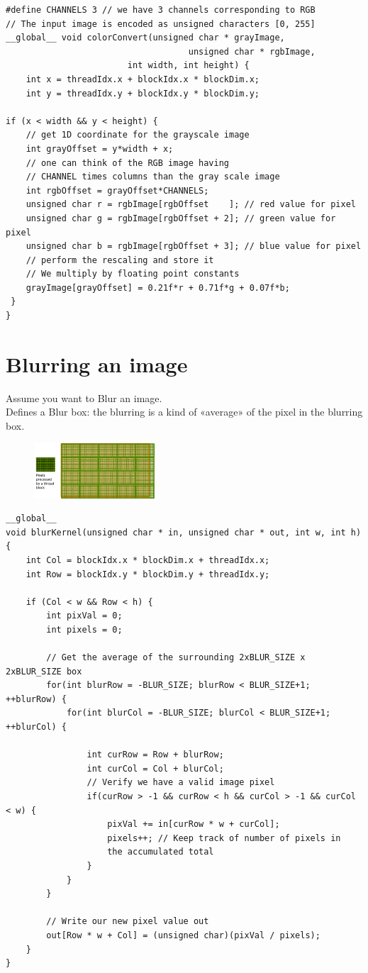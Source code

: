 \begin{verbatim}
#define CHANNELS 3 // we have 3 channels corresponding to RGB
// The input image is encoded as unsigned characters [0, 255]
__global__ void colorConvert(unsigned char * grayImage, 
									unsigned char * rgbImage,
						int width, int height) {
	int x = threadIdx.x + blockIdx.x * blockDim.x;
	int y = threadIdx.y + blockIdx.y * blockDim.y;

if (x < width && y < height) {
	// get 1D coordinate for the grayscale image
	int grayOffset = y*width + x;
	// one can think of the RGB image having
	// CHANNEL times columns than the gray scale image
	int rgbOffset = grayOffset*CHANNELS;
	unsigned char r = rgbImage[rgbOffset	]; // red value for pixel
	unsigned char g = rgbImage[rgbOffset + 2]; // green value for pixel
	unsigned char b = rgbImage[rgbOffset + 3]; // blue value for pixel
	// perform the rescaling and store it
	// We multiply by floating point constants
	grayImage[grayOffset] = 0.21f*r + 0.71f*g + 0.07f*b;
 }
}
\end{verbatim}


\section{Blurring an image}
Assume you want to Blur an image.\\
Defines a Blur box: the blurring is a kind of «average» of the pixel in the blurring box.

\begin{figure}[ht]
	\centering
	\includegraphics[width=0.4\textwidth]{figure_parallel/blur.png}
\end{figure}
\FloatBarrier


\begin{verbatim}
__global__
void blurKernel(unsigned char * in, unsigned char * out, int w, int h) {
	int Col = blockIdx.x * blockDim.x + threadIdx.x;
	int Row = blockIdx.y * blockDim.y + threadIdx.y;
	
	if (Col < w && Row < h) {
		int pixVal = 0;
		int pixels = 0;
		
		// Get the average of the surrounding 2xBLUR_SIZE x 2xBLUR_SIZE box
		for(int blurRow = -BLUR_SIZE; blurRow < BLUR_SIZE+1; ++blurRow) {
			for(int blurCol = -BLUR_SIZE; blurCol < BLUR_SIZE+1; ++blurCol) {
		
				int curRow = Row + blurRow;
				int curCol = Col + blurCol;
				// Verify we have a valid image pixel
				if(curRow > -1 && curRow < h && curCol > -1 && curCol < w) {
					pixVal += in[curRow * w + curCol];
					pixels++; // Keep track of number of pixels in
					the accumulated total
				}
			}
		}

		// Write our new pixel value out
		out[Row * w + Col] = (unsigned char)(pixVal / pixels);
	}
}
\end{verbatim}

